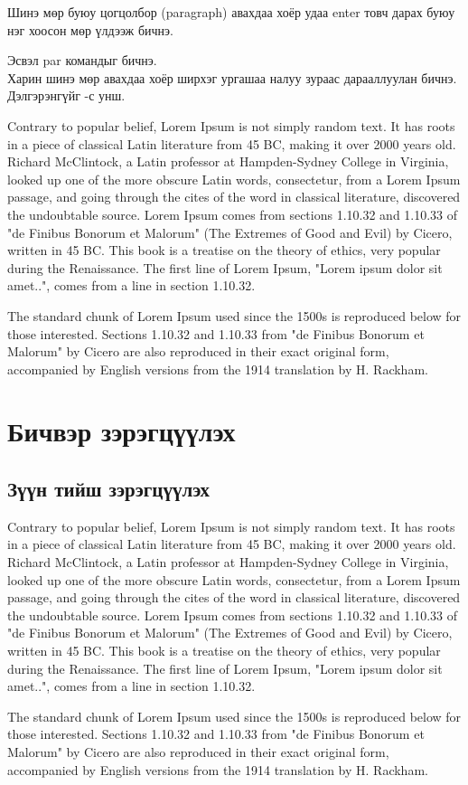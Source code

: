 \documentclass[12pt,A4]{report}
\begin{document}
Шинэ мөр буюу цогцолбор (paragraph) авахдаа хоёр удаа enter товч дарах буюу нэг хоосон мөр үлдээж бичнэ. \par Эсвэл par командыг бичнэ.
\\Харин шинэ мөр авахдаа хоёр ширхэг ургашаа налуу зураас дарааллуулан бичнэ.  Дэлгэрэнгүйг \cite{pharagraph1}-с унш.

Contrary to popular belief, Lorem Ipsum is not simply random text. It has roots in a piece of classical Latin literature from 45 BC, making it over 2000 years old. Richard McClintock, a Latin professor at Hampden-Sydney College in Virginia, looked up one of the more obscure Latin words, consectetur, from a Lorem Ipsum passage, and going through the cites of the word in classical literature, discovered the undoubtable source. Lorem Ipsum comes from sections 1.10.32 and 1.10.33 of "de Finibus Bonorum et Malorum" (The Extremes of Good and Evil) by Cicero, written in 45 BC. This book is a treatise on the theory of ethics, very popular during the Renaissance. The first line of Lorem Ipsum, "Lorem ipsum dolor sit amet..", comes from a line in section 1.10.32.

The standard chunk of Lorem Ipsum used since the 1500s is reproduced below for those interested. Sections 1.10.32 and 1.10.33 from "de Finibus Bonorum et Malorum" by Cicero are also reproduced in their exact original form, accompanied by English versions from the 1914 translation by H. Rackham.

\section{Бичвэр зэрэгцүүлэх}
\subsection{Зүүн тийш зэрэгцүүлэх}
\begin{flushleft}
	Contrary to popular belief, Lorem Ipsum is not simply random text. It has roots in a piece of classical Latin literature from 45 BC, making it over 2000 years old. Richard McClintock, a Latin professor at Hampden-Sydney College in Virginia, looked up one of the more obscure Latin words, consectetur, from a Lorem Ipsum passage, and going through the cites of the word in classical literature, discovered the undoubtable source. Lorem Ipsum comes from sections 1.10.32 and 1.10.33 of "de Finibus Bonorum et Malorum" (The Extremes of Good and Evil) by Cicero, written in 45 BC. This book is a treatise on the theory of ethics, very popular during the Renaissance. The first line of Lorem Ipsum, "Lorem ipsum dolor sit amet..", comes from a line in section 1.10.32.

	The standard chunk of Lorem Ipsum used since the 1500s is reproduced below for those interested. Sections 1.10.32 and 1.10.33 from "de Finibus Bonorum et Malorum" by Cicero are also reproduced in their exact original form, accompanied by English versions from the 1914 translation by H. Rackham.
\end{flushleft}
\end{document}
